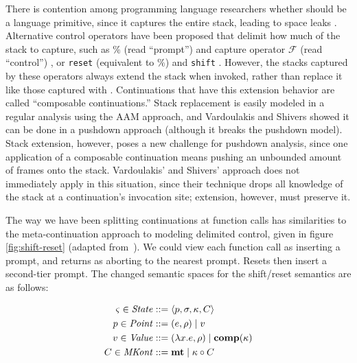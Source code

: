 There is contention among programming language researchers whether  should be a language primitive, since it captures the entire stack, leading to space leaks \citep{ianjohnson:kiselyov:against-callcc}.
%
Alternative control operators have been proposed that delimit how much of the stack to capture, such as $\%$ (read ``prompt'') and capture operator ${\mathcal F}$ (read ``control'') \citep{ianjohnson:felleisen:control:1988}, or \texttt{reset} (equivalent to $\%$) and \texttt{shift} \citep{ianjohnson:danvy:filinski:delim:1990}.
%
However, the stacks captured by these operators always extend the stack when invoked, rather than replace it like those captured with .
%
Continuations that have this extension behavior are called ``composable continuations.''
%
Stack replacement is easily modeled in a regular analysis using the AAM approach, and Vardoulakis and Shivers showed it can be done in a pushdown approach (although it breaks the pushdown model).
%
Stack extension, however, poses a new challenge for pushdown analysis, since one application of a composable continuation means pushing an unbounded amount of frames onto the stack.
%
Vardoulakis' and Shivers' approach does not immediately apply in this situation, since their technique drops all knowledge of the stack at a continuation's invocation site; extension, however, must preserve it.

The way we have been splitting continuations at function calls has similarities to the meta-continuation approach to modeling delimited control, given in figure \ref{fig:shift-reset} (adapted from~\citep{ianjohnson:Biernacki2006274}).
%
We could view each function call as inserting a prompt, and returns as aborting to the nearest prompt.
%
Resets then insert a second-tier prompt.
%
The changed semantic spaces for the shift/reset semantics are as follows:

\begin{align*}
  \varsigma \in \mathit{State} &::= \langle p, \sigma, \kappa, C \rangle \\
  p \in \mathit{Point} &::= (e, \rho) \mid v \\
  v \in \mathit{Value} &::= (\lambda{} x. e, \rho) \mid \mathbf{comp}(\kappa) \\
  C \in \mathit{MKont} &::= \mathbf{mt} \mid \kappa\circ C
\end{align*}

